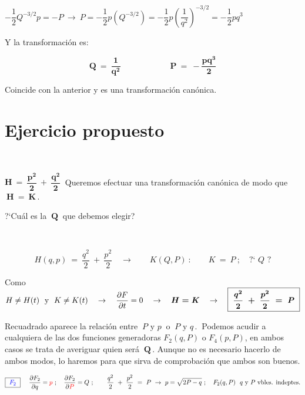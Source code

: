  $-\dfrac 1 2 Q^{-3/2} p = - P \ \to \ P=-\dfrac 1 2 p (Q^{-3/2})=-\dfrac 1 2 p \left( \dfrac 1{q^2} \right) ^{-3/2} =-\dfrac 1 2 pq^3$
 
 Y la transformación es: 
 
 $$\boldsymbol{ Q\ = \ \dfrac 1 {q^2} \qquad \qquad \qquad P \ = \ -\dfrac{pq^3}{2} }$$ 
 
 Coincide con la anterior y es una transformación canónica.
 
 \section{Ejercicio propuesto}
 \vspace{0.5cm}

\begin{ejercicio}
\begin{adjustwidth}{10pt}{10pt}
$\,$ 

$\boldsymbol{ H\ = \ \dfrac {p^2}2 \ + \ \dfrac{q^2} 2} \ $ Queremos efectuar una transformación canónica de modo que  $\ \boldsymbol{H\ = \ K} \, . \ $ 

?`Cuál es la $ \ \boldsymbol{Q} \ $ que debemos elegir?

$\,$ 
\end{adjustwidth} 	
\end{ejercicio}

\vspace{5pt}

\color{NavyBlue}


$$H(q,p) \ = \ \dfrac {q^2}2 \ + \ \dfrac {p^2}2 \quad \to \qquad K(Q,P)\ :\qquad K\ =\ P \ ; \quad \text{?` } Q \text{ ?} $$  


\vspace{5mm} Como $H\neq H(t) \ \text { y } \ K\neq K(t) \quad \to \quad \displaystyle \pdv{F}{t}=0 \quad \to \quad \boldsymbol{H=K} \quad \to \quad \boxed{ \ \boldsymbol{ \dfrac {q^2}2 \ + \ \dfrac {p^2}2 \ = \ P }\ }$ 

Recuadrado aparece la relación entre $\ P \text{ y } p \ \text{ o } \ P \text{ y } q \, . \ $ Podemos acudir a cualquiera de las dos funciones generadoras $F_2(q,P) \text{ o } F_4(p,P)$, en ambos casos se trata de averiguar quien será $\ \boldsymbol Q \, . $ Aunque no es necesario hacerlo de ambos modos, lo haremos para que sirva de comprobación que ambos son buenos.

\vspace{5mm} $\boxed{ \ \textcolor{blue}{F_2}  \ }  \quad  \  \displaystyle
\pdv{F_2}{q}=\textcolor{red}{p} \ ; \quad \pdv{F_2}{\textcolor{red}{P}}=Q \ ; \qquad \dfrac {q^2}2 \ + \ \dfrac {p^2}2 \ = \ P  \ \to \ p=\sqrt{2P-q} \ ;
\quad F_2(q,P)\ \ q \text{ y } P \text{\ vbles. indeptes.}$

